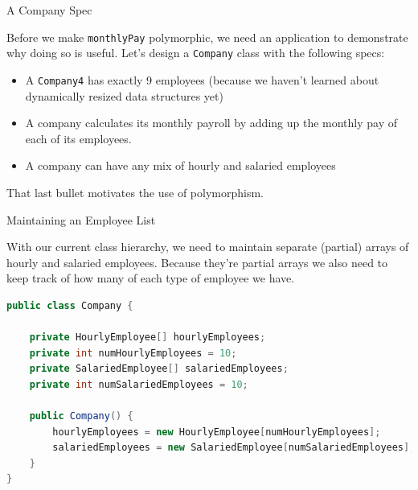 \documentclass{beamer}
\begin{document}
\begin{frame}[fragile]{A Company Spec}


Before we make {\tt monthlyPay} polymorphic, we need an application to demonstrate why doing so is useful.  Let's design a {\tt Company} class with the following specs:

\begin{itemize}
\item A {\tt Company4} has exactly 9 employees (because we haven't learned about dynamically resized data structures yet)
\item A company calculates its monthly payroll by adding up the monthly pay of each of its employees.
\item A company can have any mix of hourly and salaried employees
\end{itemize}

That last bullet motivates the use of polymorphism.

\end{frame}

\begin{frame}[fragile]{Maintaining an Employee List}


With our current class hierarchy, we need to maintain separate (partial) arrays of hourly and salaried employees.  Because they're partial arrays we also need to keep track of how many of each type of employee we have.
\begin{lstlisting}[language=Java]
public class Company {

    private HourlyEmployee[] hourlyEmployees;
    private int numHourlyEmployees = 10;
    private SalariedEmployee[] salariedEmployees;
    private int numSalariedEmployees = 10;

    public Company() {
        hourlyEmployees = new HourlyEmployee[numHourlyEmployees];
        salariedEmployees = new SalariedEmployee[numSalariedEmployees];
    }
}
\end{lstlisting}


\end{frame}
\end{document}
